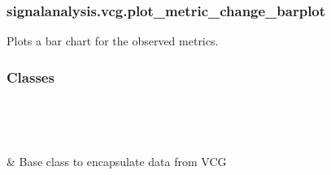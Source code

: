 \documentclass[letterpaper,10pt,english]{sphinxmanual}
\begin{document}
\subsubsection{signalanalysis.vcg.plot\_metric\_change\_barplot}
\label{\detokenize{_autosummary/signalanalysis.vcg.plot_metric_change_barplot:signalanalysis-vcg-plot-metric-change-barplot}}\label{\detokenize{_autosummary/signalanalysis.vcg.plot_metric_change_barplot::doc}}

\begin{fulllineitems}
\label{\detokenize{_autosummary/signalanalysis.vcg.plot_metric_change_barplot:signalanalysis.vcg.plot_metric_change_barplot}}
\sphinxAtStartPar
Plots a bar chart for the observed metrics.

\end{fulllineitems}

\subsubsection*{Classes}


\begin{savenotes}\sphinxatlongtablestart\begin{longtable}[c]{}
\hline

\endfirsthead

%
{}\\
\hline

\endhead

\hline
{}\\
\endfoot

\endlastfoot

\sphinxAtStartPar
{\hyperref[\detokenize{_autosummary/signalanalysis.vcg.Vcg:signalanalysis.vcg.Vcg}]{}}
&
\sphinxAtStartPar
Base class to encapsulate data from VCG
\\
\hline
\end{longtable}\sphinxatlongtableend\end{savenotes}
\end{document}
